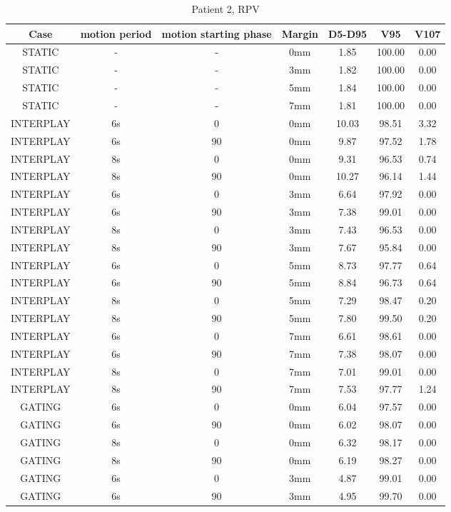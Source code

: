\begin{table}[H]
  \centering
  \caption{Patient 2, RPV}
  \begin{tabular}{|c||c|c|c||c|c|c|}
    \hline\hline
    Case & motion period & motion starting phase & Margin & D5-D95 & V95 & V107\\
    \hline 
STATIC & - & - & 0mm & 1.85 & 100.00 & 0.00 \\
STATIC & - & - & 3mm & 1.82 & 100.00 & 0.00 \\
STATIC & - & - & 5mm & 1.84 & 100.00 & 0.00 \\
STATIC & - & - & 7mm & 1.81 & 100.00 & 0.00 \\
INTERPLAY & 6s & 0 & 0mm & 10.03 & 98.51 & 3.32 \\
INTERPLAY & 6s & 90 & 0mm & 9.87 & 97.52 & 1.78 \\
INTERPLAY & 8s & 0 & 0mm & 9.31 & 96.53 & 0.74 \\
INTERPLAY & 8s & 90 & 0mm & 10.27 & 96.14 & 1.44 \\
INTERPLAY & 6s & 0 & 3mm & 6.64 & 97.92 & 0.00 \\
INTERPLAY & 6s & 90 & 3mm & 7.38 & 99.01 & 0.00 \\
INTERPLAY & 8s & 0 & 3mm & 7.43 & 96.53 & 0.00 \\
INTERPLAY & 8s & 90 & 3mm & 7.67 & 95.84 & 0.00 \\
INTERPLAY & 6s & 0 & 5mm & 8.73 & 97.77 & 0.64 \\
INTERPLAY & 6s & 90 & 5mm & 8.84 & 96.73 & 0.64 \\
INTERPLAY & 8s & 0 & 5mm & 7.29 & 98.47 & 0.20 \\
INTERPLAY & 8s & 90 & 5mm & 7.80 & 99.50 & 0.20 \\
INTERPLAY & 6s & 0 & 7mm & 6.61 & 98.61 & 0.00 \\
INTERPLAY & 6s & 90 & 7mm & 7.38 & 98.07 & 0.00 \\
INTERPLAY & 8s & 0 & 7mm & 7.01 & 99.01 & 0.00 \\
INTERPLAY & 8s & 90 & 7mm & 7.53 & 97.77 & 1.24 \\
GATING & 6s & 0 & 0mm & 6.04 & 97.57 & 0.00 \\
GATING & 6s & 90 & 0mm & 6.02 & 98.07 & 0.00 \\
GATING & 8s & 0 & 0mm & 6.32 & 98.17 & 0.00 \\
GATING & 8s & 90 & 0mm & 6.19 & 98.27 & 0.00 \\
GATING & 6s & 0 & 3mm & 4.87 & 99.01 & 0.00 \\
GATING & 6s & 90 & 3mm & 4.95 & 99.70 & 0.00 \\

\end{tabular}
\end{table}
